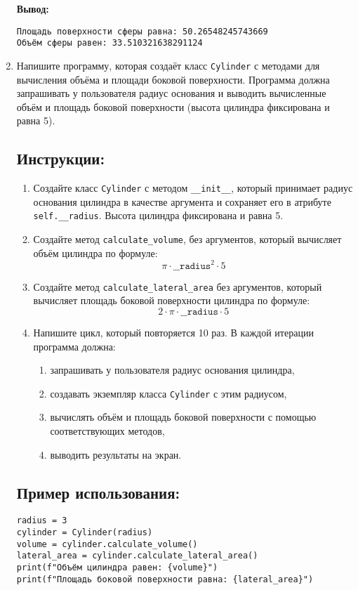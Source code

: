 \begin{enumerate}
\textbf{Вывод:}
\begin{verbatim}
Площадь поверхности сферы равна: 50.26548245743669
Объём сферы равен: 33.510321638291124
\end{verbatim}

\item
Напишите программу, которая создаёт класс \texttt{Cylinder} с методами для вычисления объёма
и площади боковой поверхности. Программа должна запрашивать у пользователя радиус основания
и выводить вычисленные объём и площадь боковой поверхности (высота цилиндра фиксирована и равна 5).

\subsection*{Инструкции:}
\begin{enumerate}
\item Создайте класс \texttt{Cylinder} с методом
\texttt{\_\_init\_\_}, который принимает радиус основания цилиндра в
качестве аргумента и сохраняет его в атрибуте \texttt{self.\_\_radius}.
Высота цилиндра фиксирована и равна 5.

\item Создайте метод \texttt{calculate\_volume},
без аргументов, который вычисляет объём цилиндра по формуле:
\[
\pi \cdot \texttt{\_\_radius}^2 \cdot 5
\]

\item Создайте метод \texttt{calculate\_lateral\_area} без аргументов,
который вычисляет площадь боковой поверхности цилиндра по формуле:
\[
2 \cdot \pi \cdot \texttt{\_\_radius} \cdot 5
\]

\item Напишите цикл, который повторяется 10 раз. В каждой итерации программа должна:
\begin{enumerate}
\item запрашивать у пользователя радиус основания цилиндра,
\item создавать экземпляр класса \texttt{Cylinder} с этим радиусом,
\item вычислять объём и площадь боковой поверхности с помощью соответствующих методов,
\item выводить результаты на экран.
\end{enumerate}
\end{enumerate}

\subsection*{Пример использования:}
\begin{verbatim}
radius = 3
cylinder = Cylinder(radius)
volume = cylinder.calculate_volume()
lateral_area = cylinder.calculate_lateral_area()
print(f"Объём цилиндра равен: {volume}")
print(f"Площадь боковой поверхности равна: {lateral_area}")
\end{verbatim}


\end{enumerate}
